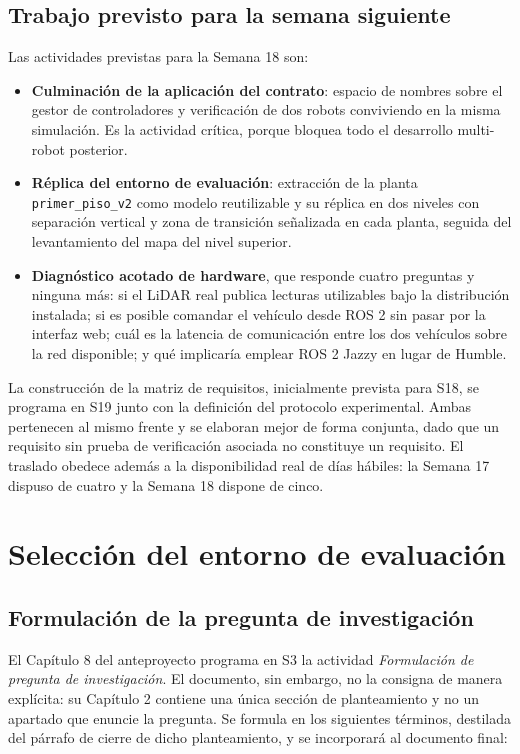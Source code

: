 \documentclass[12pt,letterpaper]{article}
\begin{document}
\subsection{Trabajo previsto para la semana siguiente}

Las actividades previstas para la Semana 18 son:

\begin{itemize}
    \item \textbf{Culminación de la aplicación del contrato}: espacio de nombres sobre el gestor de controladores y verificación de dos robots conviviendo en la misma simulación. Es la actividad crítica, porque bloquea todo el desarrollo multi-robot posterior.
    \item \textbf{Réplica del entorno de evaluación}: extracción de la planta \texttt{primer\_piso\_v2} como modelo reutilizable y su réplica en dos niveles con separación vertical y zona de transición señalizada en cada planta, seguida del levantamiento del mapa del nivel superior.
    \item \textbf{Diagnóstico acotado de hardware}, que responde cuatro preguntas y ninguna más: si el LiDAR real publica lecturas utilizables bajo la distribución instalada; si es posible comandar el vehículo desde ROS 2 sin pasar por la interfaz web; cuál es la latencia de comunicación entre los dos vehículos sobre la red disponible; y qué implicaría emplear ROS 2 Jazzy en lugar de Humble.
\end{itemize}

La construcción de la matriz de requisitos, inicialmente prevista para S18, se programa en S19 junto con la definición del protocolo experimental. Ambas pertenecen al mismo frente y se elaboran mejor de forma conjunta, dado que un requisito sin prueba de verificación asociada no constituye un requisito. El traslado obedece además a la disponibilidad real de días hábiles: la Semana 17 dispuso de cuatro y la Semana 18 dispone de cinco.

\section{Selección del entorno de evaluación}
\label{sec:entorno}

\subsection{Formulación de la pregunta de investigación}

El Capítulo 8 del anteproyecto \cite{anteproyecto} programa en S3 la actividad \textit{Formulación de pregunta de investigación}. El documento, sin embargo, no la consigna de manera explícita: su Capítulo 2 contiene una única sección de planteamiento y no un apartado que enuncie la pregunta. Se formula en los siguientes términos, destilada del párrafo de cierre de dicho planteamiento, y se incorporará al documento final:
\end{document}

